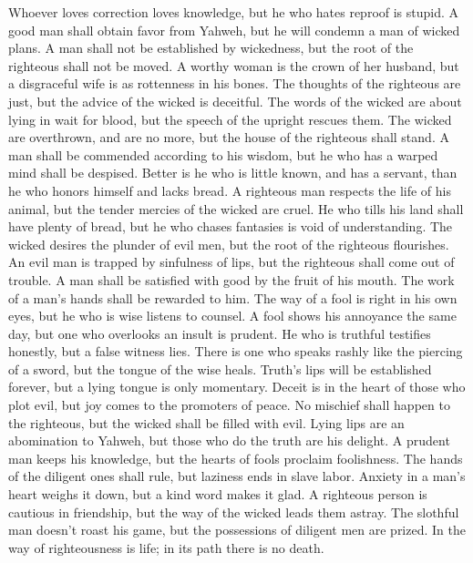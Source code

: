  Whoever loves correction loves knowledge, but he who hates
reproof is stupid.  A good man shall obtain favor from
Yahweh, but he will condemn a man of wicked plans.  A man
shall not be established by wickedness, but the root of the righteous
shall not be moved.  A worthy woman is the crown of her
husband, but a disgraceful wife is as rottenness in his bones.
 The thoughts of the righteous are just, but the advice of
the wicked is deceitful.  The words of the wicked are about
lying in wait for blood, but the speech of the upright rescues them.
 The wicked are overthrown, and are no more, but the house
of the righteous shall stand.  A man shall be commended
according to his wisdom, but he who has a warped mind shall be despised.
 Better is he who is little known, and has a servant, than
he who honors himself and lacks bread.  A righteous man
respects the life of his animal, but the tender mercies of the wicked
are cruel.  He who tills his land shall have plenty of
bread, but he who chases fantasies is void of understanding.
 The wicked desires the plunder of evil men, but the root
of the righteous flourishes.  An evil man is trapped by
sinfulness of lips, but the righteous shall come out of trouble.
 A man shall be satisfied with good by the fruit of his
mouth. The work of a man's hands shall be rewarded to him. 
The way of a fool is right in his own eyes, but he who is wise listens
to counsel.  A fool shows his annoyance the same day, but
one who overlooks an insult is prudent.  He who is truthful
testifies honestly, but a false witness lies.  There is one
who speaks rashly like the piercing of a sword, but the tongue of the
wise heals.  Truth's lips will be established forever, but
a lying tongue is only momentary.  Deceit is in the heart
of those who plot evil, but joy comes to the promoters of peace.
 No mischief shall happen to the righteous, but the wicked
shall be filled with evil.  Lying lips are an abomination
to Yahweh, but those who do the truth are his delight.  A
prudent man keeps his knowledge, but the hearts of fools proclaim
foolishness.  The hands of the diligent ones shall rule,
but laziness ends in slave labor.  Anxiety in a man's heart
weighs it down, but a kind word makes it glad.  A righteous
person is cautious in friendship, but the way of the wicked leads them
astray.  The slothful man doesn't roast his game, but the
possessions of diligent men are prized.  In the way of
righteousness is life; in its path there is no death.

